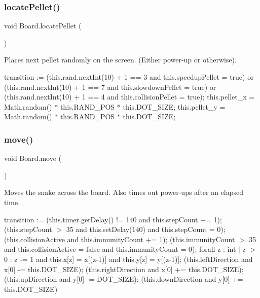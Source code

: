 \subsubsection{\texorpdfstring{locate\+Pellet()}{locatePellet()}}
{\footnotesize\ttfamily void Board.\+locate\+Pellet (\begin{DoxyParamCaption}{ }\end{DoxyParamCaption})}

Places next pellet randomly on the screen. (Either power-\/up or otherwise).

transition \+:= (this.\+rand.\+next\+Int(10) + 1 == 3 and this.\+speedup\+Pellet = true) or (this.\+rand.\+next\+Int(10) + 1 == 7 and this.\+slowdown\+Pellet = true) or (this.\+rand.\+next\+Int(10) + 1 == 4 and this.\+collision\+Pellet = true); this.\+pellet\+\_\+x = Math.\+random() $\ast$ this.\+R\+A\+N\+D\+\_\+\+P\+OS $\ast$ this.\+D\+O\+T\+\_\+\+S\+I\+ZE; this.\+pellet\+\_\+y = Math.\+random() $\ast$ this.\+R\+A\+N\+D\+\_\+\+P\+OS $\ast$ this.\+D\+O\+T\+\_\+\+S\+I\+ZE; \mbox{\label{class_board_a916df1693e14ee32843e7d2a6ed1b1b6}} 
\subsubsection{\texorpdfstring{move()}{move()}}
{\footnotesize\ttfamily void Board.\+move (\begin{DoxyParamCaption}{ }\end{DoxyParamCaption})}

Moves the snake across the board. Also times out power-\/ups after an elapsed time.

transition \+:= (this.\+timer.\+get\+Delay() != 140 and this.\+step\+Count += 1); (this.\+step\+Count $>$ 35 and this.\+set\+Delay(140) and this.\+step\+Count = 0); (this.\+collision\+Active and this.\+immunity\+Count += 1); (this.\+immunity\+Count $>$ 35 and this.\+collision\+Active = false and this.\+immunity\+Count = 0); forall z \+: int $\vert$ z $>$ 0 \+: z -\/= 1 and this.\+x\mbox{[}z\mbox{]} = x\mbox{[}(z-\/1)\mbox{]} and this.\+y\mbox{[}z\mbox{]} = y\mbox{[}(z-\/1)\mbox{]}; (this.\+left\+Direction and x\mbox{[}0\mbox{]} -\/= this.\+D\+O\+T\+\_\+\+S\+I\+ZE); (this.\+right\+Direction and x\mbox{[}0\mbox{]} += this.\+D\+O\+T\+\_\+\+S\+I\+ZE); (this.\+up\+Direction and y\mbox{[}0\mbox{]} -\/= D\+O\+T\+\_\+\+S\+I\+ZE); (this.\+down\+Direction and y\mbox{[}0\mbox{]} += this.\+D\+O\+T\+\_\+\+S\+I\+ZE) \mbox{\label{class_board_a05f7155d1fb7219fa0081ddbe68bdcad}} 
